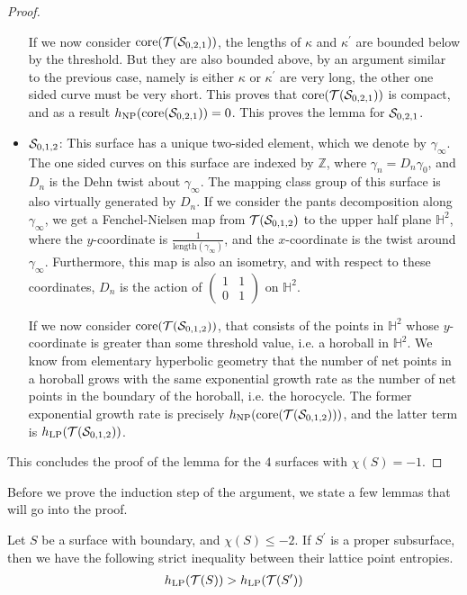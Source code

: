\documentclass[12pt, reqno]{amsart}
\begin{document}
\begin{proof}
\begin{itemize}
    If we now consider $\mathrm{core}(\mathcal{T}(\mathcal{S}_{0,2,1}))$, the lengths of $\kappa$ and $\kappa^{\prime}$ are bounded below by the threshold.
    But they are also bounded above, by an argument similar to the previous case, namely is either $\kappa$ or $\kappa^{\prime}$ are very long, the other one sided curve must be very short.
    This proves that $\mathrm{core}(\mathcal{T}(\mathcal{S}_{0,2,1}))$ is compact, and as a result $h_{\mathrm{NP}}(\mathrm{core}(\mathcal{S}_{0,2,1})) = 0$.
    This proves the lemma for $\mathcal{S}_{0,2,1}$.
  \item $\mathcal{S}_{0,1,2}$: This surface has a unique two-sided element, which we denote by $\gamma_{\infty}$.
    The one sided curves on this surface are indexed by $\mathbb{Z}$, where $\gamma_n = D_n \gamma_0$, and $D_n$ is the Dehn twist about $\gamma_\infty$.
    The mapping class group of this surface is also virtually generated by $D_n$.
    If we consider the pants decomposition along $\gamma_{\infty}$, we get a Fenchel-Nielsen map from $\mathcal{T}(\mathcal{S}_{0,1,2})$ to the upper half plane $\mathbb{H}^2$, where the $y$-coordinate is $\frac{1}{\mathrm{length}(\gamma_{\infty})}$, and the $x$-coordinate is the twist around $\gamma_{\infty}$.
    Furthermore, this map is also an isometry, and with respect to these coordinates, $D_n$ is the action of $
    \begin{pmatrix}
      1 & 1 \\
      0 & 1
    \end{pmatrix}
    $ on $\mathbb{H}^2$.

    If we now consider $\mathrm{core}(\mathcal{T}(\mathcal{S}_{0,1,2}))$, that consists of the points in $\mathbb{H}^2$ whose $y$-coordinate is greater than some threshold value, i.e. a horoball in $\mathbb{H}^2$.
    We know from elementary hyperbolic geometry that the number of net points in a horoball grows with the same exponential growth rate as the number of net points in the boundary of the horoball, i.e. the horocycle.
    The former exponential growth rate is precisely $h_{\mathrm{NP}}(\mathrm{core}(\mathcal{T}(\mathcal{S}_{0,1,2})))$, and the latter term is $h_{\mathrm{LP}}(\mathcal{T}(\mathcal{S}_{0,1,2}))$.
  \end{itemize}
  This concludes the proof of the lemma for the $4$ surfaces with $\chi(S) = -1$.
\end{proof}

Before we prove the induction step of the argument, we state a few lemmas that will go into the proof.

\begin{lemma}
  \label{lem:entropy-inequality}
  Let $S$ be a surface with boundary, and $\chi(S) \leq -2$. If $S^{\prime}$ is a proper subsurface, then we have the following strict inequality between their lattice point entropies.
  \begin{align*}
    h_{\mathrm{LP}}(\mathcal{T}(S)) > h_{\mathrm{LP}}(\mathcal{T}(S^{\prime}))
  \end{align*}
\end{lemma}
\end{document}
